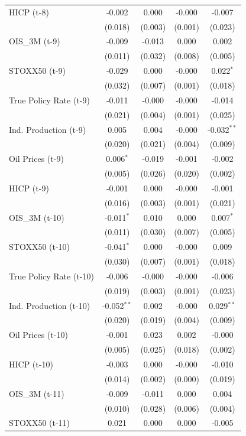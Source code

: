 \begin{longtable}[t]{lcccc}
HICP (t-8) & -0.002 & 0.000 & -0.000 & -0.007\\
 & (0.018) & (0.003) & (0.001) & (0.023)\\
OIS\_3M (t-9) & -0.009 & -0.013 & 0.000 & 0.002\\
 & (0.011) & (0.032) & (0.008) & (0.005)\\
STOXX50 (t-9) & -0.029 & 0.000 & -0.000 & 0.022$^{*}$\\
 & (0.032) & (0.007) & (0.001) & (0.018)\\
True Policy Rate (t-9) & -0.011 & -0.000 & -0.000 & -0.014\\
 & (0.021) & (0.004) & (0.001) & (0.025)\\
Ind. Production (t-9) & 0.005 & 0.004 & -0.000 & -0.032$^{**}$\\
 & (0.020) & (0.021) & (0.004) & (0.009)\\
Oil Prices (t-9) & 0.006$^{*}$ & -0.019 & -0.001 & -0.002\\
 & (0.005) & (0.026) & (0.020) & (0.002)\\
HICP (t-9) & -0.001 & 0.000 & -0.000 & -0.001\\
 & (0.016) & (0.003) & (0.001) & (0.021)\\
OIS\_3M (t-10) & -0.011$^{*}$ & 0.010 & 0.000 & 0.007$^{*}$\\
 & (0.011) & (0.030) & (0.007) & (0.005)\\
STOXX50 (t-10) & -0.041$^{*}$ & 0.000 & -0.000 & 0.009\\
 & (0.030) & (0.007) & (0.001) & (0.018)\\
True Policy Rate (t-10) & -0.006 & -0.000 & -0.000 & -0.006\\
 & (0.019) & (0.003) & (0.001) & (0.023)\\
Ind. Production (t-10) & -0.052$^{**}$ & 0.002 & -0.000 & 0.029$^{**}$\\
 & (0.020) & (0.019) & (0.004) & (0.009)\\
Oil Prices (t-10) & -0.001 & 0.023 & 0.002 & -0.000\\
 & (0.005) & (0.025) & (0.018) & (0.002)\\
HICP (t-10) & -0.003 & 0.000 & -0.000 & -0.010\\
 & (0.014) & (0.002) & (0.000) & (0.019)\\
OIS\_3M (t-11) & -0.009 & -0.011 & 0.000 & 0.004\\
 & (0.010) & (0.028) & (0.006) & (0.004)\\
STOXX50 (t-11) & 0.021 & 0.000 & 0.000 & -0.005\\

\end{longtable}
